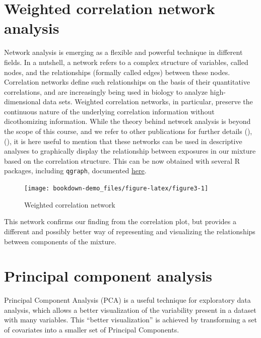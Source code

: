 \documentclass[
]{book}
\begin{document}
\hypertarget{weighted-correlation-network-analysis}{%
\section{Weighted correlation network analysis}\label{weighted-correlation-network-analysis}}

Network analysis is emerging as a flexible and powerful technique in different fields. In a nutshell, a network refers to a complex structure of variables, called nodes, and the relationships (formally called edges) between these nodes. Correlation networks define such relationships on the basis of their quantitative correlations, and are increasingly being used in biology to analyze high-dimensional data sets. Weighted correlation networks, in particular, preserve the continuous nature of the underlying correlation information without dicothomizing information. While the theory behind network analysis is beyond the scope of this course, and we refer to other publications for further details (\citet{langfelder2008wgcna}), (\citet{hevey2018network}), it is here useful to mention that these networks can be used in descriptive analyses to graphically display the relationship between exposures in our mixture based on the correlation structure. This can be now obtained with several R packages, including \texttt{qgraph}, documented \href{http://sachaepskamp.com/files/Cookbook.html\#pearson-correlations}{here}.

\begin{figure}[H]

{\centering \texttt{[image: bookdown-demo\_files/figure-latex/figure3-1]} 

}

\caption{Weighted correlation network}\label{fig:figure3}
\end{figure}

This network confirms our finding from the correlation plot, but provides a different and possibly better way of representing and visualizing the relationships between components of the mixture.

\hypertarget{principal-component-analysis}{%
\section{Principal component analysis}\label{principal-component-analysis}}

Principal Component Analysis (PCA) is a useful technique for exploratory data analysis, which allows a better visualization of the variability present in a dataset with many variables. This ``better visualization'' is achieved by transforming a set of covariates into a smaller set of Principal Components.
\end{document}
